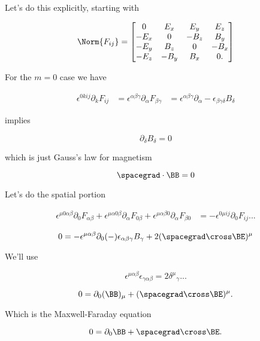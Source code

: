 Let's do this explicitly, starting with

\begin{equation}\label{eqn:relativisticElectrodynamicsL10:370}
\Norm{ F_{ij} } = 
\begin{bmatrix}
0 & E_x & E_y & E_z \\
-E_x & 0 & -B_z & B_y \\
-E_y & B_z & 0 & -B_x \\
-E_z & -B_y & B_x & 0.
\end{bmatrix}
\end{equation}

For the $m= 0$ case we have

\begin{align*}
\epsilon^{0 k i j} \partial_k F_{ij}
&=
\epsilon^{\alpha \beta \gamma} \partial_\alpha F_{\beta \gamma}
&= 
\epsilon^{\alpha \beta \gamma} \partial_\alpha -\epsilon_{\beta \gamma \delta} B_\delta
\end{align*}

implies

\begin{equation}\label{eqn:relativisticElectrodynamicsL11:830}
\partial_\delta B_\delta = 0
\end{equation}

which is just Gauss's law for magnetism

\begin{equation}\label{eqn:relativisticElectrodynamicsL11:850}
\spacegrad \cdot \BB = 0
\end{equation}

Let's do the spatial portion

\begin{align*}
\epsilon^{\mu 0 \alpha \beta} \partial_0 F_{\alpha \beta}
+\epsilon^{\mu \alpha 0 \beta} \partial_\alpha F_{0 \beta}
+\epsilon^{\mu \alpha \beta 0} \partial_\alpha F_{\beta 0}
&= -
\epsilon^{0 \mu i j} \partial_0 F_{ij}
...
\end{align*}

\begin{equation}\label{eqn:relativisticElectrodynamicsL11:870}
0 = -\epsilon^{\mu \alpha \beta} \partial_0 (-) \epsilon_{\alpha \beta \gamma} B_\gamma + 2 (\spacegrad \cross \BE)^\mu
\end{equation}

We'll use

\begin{equation}\label{eqn:relativisticElectrodynamicsL11:890}
\epsilon^{\mu \alpha \beta} \epsilon_{\gamma \alpha \beta} = 2 {\delta^\mu}_\gamma
...
\end{equation}

\begin{equation}\label{eqn:relativisticElectrodynamicsL11:910}
0 = \partial_0 (\BB)_\mu + (\spacegrad \cross \BE)^\mu.
\end{equation}

Which is the Maxwell-Faraday equation

\begin{equation}\label{eqn:relativisticElectrodynamicsL11:930}
0 = \partial_0 \BB + \spacegrad \cross \BE.
\end{equation}

\EndArticle
